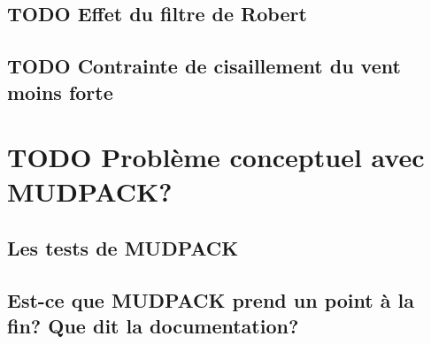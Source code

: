 \documentclass[10pt]{article}
\numberwithin{equation}{section}
\begin{document}
\subsection{{\bfseries\sffamily TODO} Effet du filtre de Robert}
\label{sec:org059108e}
\subsection{{\bfseries\sffamily TODO} Contrainte de cisaillement du vent moins forte}
\label{sec:org0d8778d}


\section{{\bfseries\sffamily TODO} Problème conceptuel avec MUDPACK?}
\label{sec:orga02ca3e}
\subsection{Les tests de MUDPACK}
\label{sec:org52c3c33}
\subsection{Est-ce que MUDPACK prend un point à la fin? Que dit la documentation?}
\label{sec:orgbb2cb48}
\end{document}

